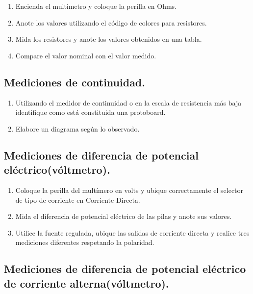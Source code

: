 \documentclass[10pt]{article}
\begin{document}
\begin{multicols}{2}
\begin{enumerate}
	\item Encienda el multimetro y coloque la perilla en Ohms.
	\item Anote los valores utilizando el código de colores para resistores.
	\item Mida los resistores y anote los valores obtenidos en una tabla.
	\item Compare el valor nominal con el valor medido.
\end{enumerate}

\subsection{Mediciones de continuidad.}

\begin{enumerate}
	\item Utilizando el medidor de continuidad o en la escala de resistencia más baja identifique como está constituida una protoboard.
	\item Elabore un diagrama según lo observado.
\end{enumerate}

\subsection{Mediciones de diferencia de potencial eléctrico(vóltmetro).}

\begin{enumerate}
	\item Coloque la perilla del multímero en volts y ubique correctamente el selector de tipo de corriente en Corriente Directa.
	\item Mida el diferencia de potencial eléctrico de las pilas y anote sus valores.
	\item Utilice la fuente regulada, ubique las salidas de corriente directa y realice tres mediciones diferentes respetando la polaridad.
\end{enumerate}

\subsection{Mediciones de diferencia de potencial eléctrico de corriente alterna(vóltmetro).}


\end{multicols}
\end{document}
